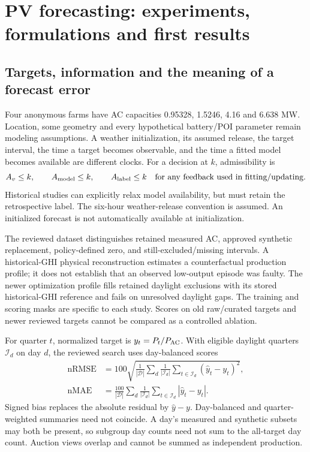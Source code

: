 \clearpage
\section{PV forecasting: experiments, formulations and first results}
\label{sec:forecast-research}

\subsection{Targets, information and the meaning of a forecast error}
Four anonymous farms have AC capacities 0.95328, 1.5246, 4.16 and 6.638 MW.
Location, some geometry and every hypothetical battery/POI parameter remain
modeling assumptions. A weather initialization, its assumed release, the target
interval, the time a target becomes observable, and the time a fitted model
becomes available are different clocks. For a decision at $k$, admissibility is
\begin{equation}
 A_v\le k,\qquad A_{\rm model}\le k,
 \qquad A_{\rm label}\le k\quad\text{for any feedback used in fitting/updating}.
\end{equation}
Historical studies can explicitly relax model availability, but must retain the
retrospective label. The six-hour weather-release convention is assumed.
An initialized forecast is not automatically available at initialization.

The reviewed dataset distinguishes retained measured AC, approved synthetic
replacement, policy-defined zero, and still-excluded/missing intervals. A
historical-GHI physical reconstruction estimates a counterfactual production
profile; it does not establish that an observed low-output episode was faulty.
The newer optimization profile fills retained daylight exclusions with its
stored historical-GHI reference and fails on unresolved daylight gaps. The
training and scoring masks are specific to each study. Scores on old raw/curated
targets and newer reviewed targets cannot be compared as a controlled ablation.

For quarter $t$, normalized target is $y_t=P_t/P_{\rm AC}$. With eligible daylight
quarters $\mathcal I_d$ on day $d$, the reviewed search uses day-balanced scores
\begin{align}
 \mathrm{nRMSE}&=100\sqrt{\frac1{|\mathcal D|}\sum_d
             \frac1{|\mathcal I_d|}\sum_{t\in\mathcal I_d}(\hat y_t-y_t)^2},\\
 \mathrm{nMAE}&=\frac{100}{|\mathcal D|}\sum_d
             \frac1{|\mathcal I_d|}\sum_{t\in\mathcal I_d}|\hat y_t-y_t|.
\end{align}
Signed bias replaces the absolute residual by $\hat y-y$. Day-balanced and
quarter-weighted summaries need not coincide. A day's measured and synthetic
subsets may both be present, so subgroup day counts need not sum to the all-target
day count. Auction views overlap and cannot be summed as independent production.

